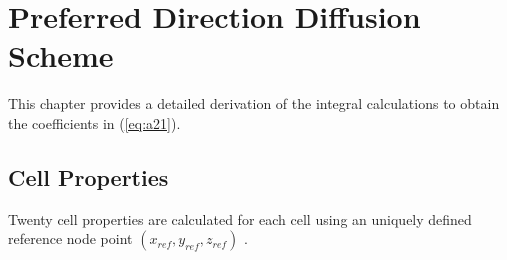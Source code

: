 \appendix
\chapter{Preferred Direction Diffusion Scheme}
This chapter provides a detailed derivation of the integral calculations to obtain the coefficients in (\ref{eq:a21}).
\label{app:aa}
\section{Cell Properties}
\label{sec:one}

Twenty cell properties are calculated for each cell using an uniquely defined reference node point $(x_{ref},y_{ref},z_{ref})$ .
